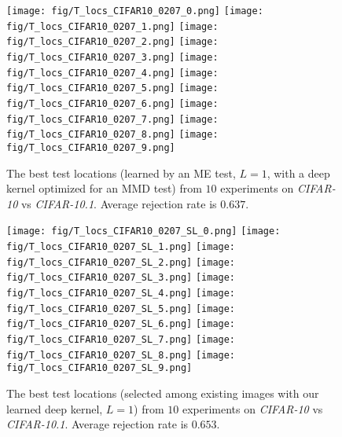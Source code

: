 \documentclass{article}
\begin{document}
\begin{figure}[!p]
    \begin{center}
        \subfigure
        {\texttt{[image: fig/T\_locs\_CIFAR10\_0207\_0.png]}}
        \subfigure
        {\texttt{[image: fig/T\_locs\_CIFAR10\_0207\_1.png]}}
        \subfigure
        {\texttt{[image: fig/T\_locs\_CIFAR10\_0207\_2.png]}}
        \subfigure
        {\texttt{[image: fig/T\_locs\_CIFAR10\_0207\_3.png]}}
        \subfigure
        {\texttt{[image: fig/T\_locs\_CIFAR10\_0207\_4.png]}}
        \subfigure
        {\texttt{[image: fig/T\_locs\_CIFAR10\_0207\_5.png]}}
        \subfigure
        {\texttt{[image: fig/T\_locs\_CIFAR10\_0207\_6.png]}}
        \subfigure
        {\texttt{[image: fig/T\_locs\_CIFAR10\_0207\_7.png]}}
        \subfigure
        {\texttt{[image: fig/T\_locs\_CIFAR10\_0207\_8.png]}}
        \subfigure
        {\texttt{[image: fig/T\_locs\_CIFAR10\_0207\_9.png]}}
        \caption{The best test locations (learned by an ME test, $L=1$, with a deep kernel optimized for an MMD test) from $10$ experiments on \emph{CIFAR-10} vs \emph{CIFAR-10.1}. Average rejection rate is $0.637$.}  \label{fig:CIFAR10_interp_learnt}
    \end{center}
    \vspace{-0.5cm}
\end{figure}

\begin{figure}[!p]
    \begin{center}
        \subfigure
        {\texttt{[image: fig/T\_locs\_CIFAR10\_0207\_SL\_0.png]}}
        \subfigure
        {\texttt{[image: fig/T\_locs\_CIFAR10\_0207\_SL\_1.png]}}
        \subfigure
        {\texttt{[image: fig/T\_locs\_CIFAR10\_0207\_SL\_2.png]}}
        \subfigure
        {\texttt{[image: fig/T\_locs\_CIFAR10\_0207\_SL\_3.png]}}
        \subfigure
        {\texttt{[image: fig/T\_locs\_CIFAR10\_0207\_SL\_4.png]}}
        \subfigure
        {\texttt{[image: fig/T\_locs\_CIFAR10\_0207\_SL\_5.png]}}
        \subfigure
        {\texttt{[image: fig/T\_locs\_CIFAR10\_0207\_SL\_6.png]}}
        \subfigure
        {\texttt{[image: fig/T\_locs\_CIFAR10\_0207\_SL\_7.png]}}
        \subfigure
        {\texttt{[image: fig/T\_locs\_CIFAR10\_0207\_SL\_8.png]}}
        \subfigure
        {\texttt{[image: fig/T\_locs\_CIFAR10\_0207\_SL\_9.png]}}
        \caption{The best test locations (selected among existing images with our learned deep kernel, $L=1$) from $10$ experiments on \emph{CIFAR-10} vs \emph{CIFAR-10.1}. Average rejection rate is $0.653$.}  \label{fig:CIFAR10_interp_learnt_SL}
    \end{center}
    \vspace{-0.5cm}
\end{figure}
\end{document}
